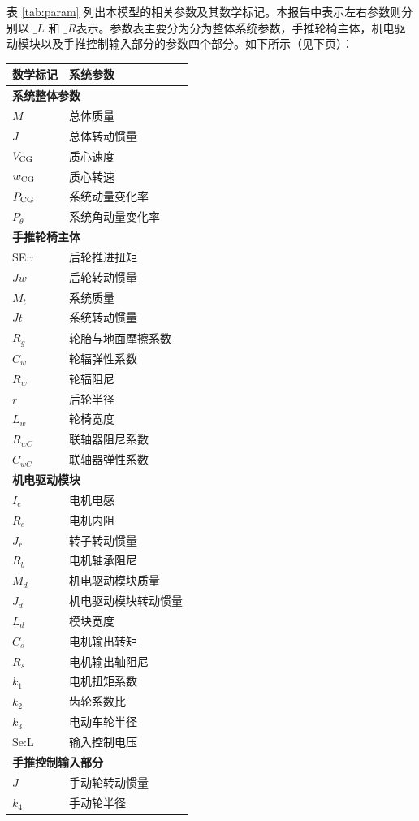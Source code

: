 表 \ref{tab:param} 列出本模型的相关参数及其数学标记。本报告中表示左右参数则分别以 $ \_L $ 和 $ \_R $表示。参数表主要分为分为整体系统参数，手推轮椅主体，机电驱动模块以及手推控制输入部分的参数四个部分。如下所示（见下页）：

\begin{table}[H]
\footnotesize
\caption{系统主要参数及其数学标记}\label{tab:param}
\begin{longtable}{l|l}
	\toprule
	\textbf{数学标记} & \textbf{系统参数}\\
	\midrule
	\endhead
	\multicolumn{2}{l}{\textbf{系统整体参数}} \\ %
	\midrule
	$ M $ & 总体质量\\
	$ J $ & 总体转动惯量\\
	$ V_{\rm{CG}} $ & 质心速度\\
	$ w_{\rm{CG}} $ & 质心转速\\
	$ P_{\rm{CG}} $ & 系统动量变化率\\
	$ P_{\theta} $ & 系统角动量变化率\\
	\midrule
	\multicolumn{2}{l}{\textbf{手推轮椅主体}} \\
	\midrule
	SE:$\tau$ & 后轮推进扭矩 \\
	$ J w $ & 后轮转动惯量\\
	$ M_t $ & 系统质量\\
	$ J t $ & 系统转动惯量\\
	$ R_g $ & 轮胎与地面摩擦系数\\
	$ C_w $ & 轮辐弹性系数\\
	$ R_w $ & 轮辐阻尼\\
	$ r $ & 后轮半径\\
	$ L_w $ & 轮椅宽度\\
	$ R_{wC} $ & 联轴器阻尼系数\\
	$ C_{wC} $ & 联轴器弹性系数\\
	\midrule
	\multicolumn{2}{l}{\textbf{机电驱动模块}} \\
	\midrule
	$ I_e $ & 电机电感\\
	$ R_e $ & 电机内阻\\
	$ J_r $ & 转子转动惯量\\
	$ R_b $ & 电机轴承阻尼\\
	$ M_d $ & 机电驱动模块质量\\
	$ J_d $ & 机电驱动模块转动惯量\\
	$ L_d $ & 模块宽度\\
	$ C_s $ & 电机输出转矩\\
	$ R_s $ & 电机输出轴阻尼\\
	$ k_1 $ & 电机扭矩系数\\ %
	$ k_2 $ & 齿轮系数比\\ %
	$ k_3 $ & 电动车轮半径 \\ %
	Se:L & 输入控制电压\\
	\midrule
	\multicolumn{2}{l}{\textbf{手推控制输入部分}}\\
	\midrule
	$ J $ & 手动轮转动惯量\\
	$ k_4 $ & 手动轮半径\\ %
	\bottomrule
\end{longtable}
\end{table}